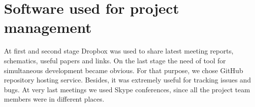 \section{Software used for project management}
At first and second stage Dropbox was used to share latest meeting reports, schematics, useful papers and links. On the last stage the need of tool for simultaneous development became obvious. For that purpose, we chose GitHub repository hosting service. Besides, it was extremely useful for tracking issues and bugs. At very last meetings we used Skype conferences, since all the project team members were in different places.
